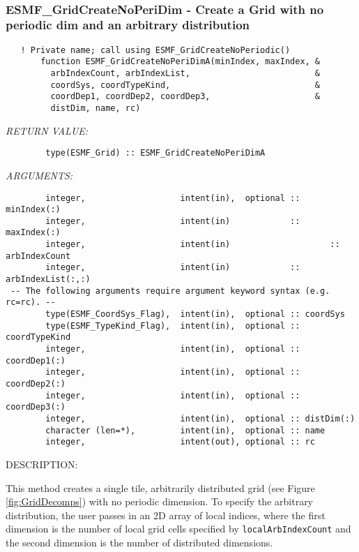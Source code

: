  
\mbox{}\hrulefill\ 
 
\subsubsection [ESMF\_GridCreateNoPeriDim] {ESMF\_GridCreateNoPeriDim - Create a Grid with no periodic dim and an arbitrary distribution}


 
\begin{verbatim}   ! Private name; call using ESMF_GridCreateNoPeriodic()
       function ESMF_GridCreateNoPeriDimA(minIndex, maxIndex, &
         arbIndexCount, arbIndexList,                         &
         coordSys, coordTypeKind,                             &
         coordDep1, coordDep2, coordDep3,                     &
         distDim, name, rc)\end{verbatim}{\em RETURN VALUE:}
\begin{verbatim}        type(ESMF_Grid) :: ESMF_GridCreateNoPeriDimA\end{verbatim}{\em ARGUMENTS:}
\begin{verbatim}        integer,                   intent(in),  optional :: minIndex(:)
        integer,                   intent(in)            :: maxIndex(:)
        integer,                   intent(in)                    :: arbIndexCount
        integer,                   intent(in)            :: arbIndexList(:,:)
 -- The following arguments require argument keyword syntax (e.g. rc=rc). --
        type(ESMF_CoordSys_Flag),  intent(in),  optional :: coordSys
        type(ESMF_TypeKind_Flag),  intent(in),  optional :: coordTypeKind
        integer,                   intent(in),  optional :: coordDep1(:)
        integer,                   intent(in),  optional :: coordDep2(:)
        integer,                   intent(in),  optional :: coordDep3(:)
        integer,                   intent(in),  optional :: distDim(:)
        character (len=*),         intent(in),  optional :: name
        integer,                   intent(out), optional :: rc\end{verbatim}
{\sf DESCRIPTION:\\ }


  
   This method creates a single tile, arbitrarily distributed grid
   (see Figure \ref{fig:GridDecomps}) with no periodic dimension.
   To specify the arbitrary distribution, the user passes in an 2D array
   of local indices, where the first dimension is the number of local grid cells
   specified by {\tt localArbIndexCount} and the second dimension is the number of distributed
   dimensions.
  
